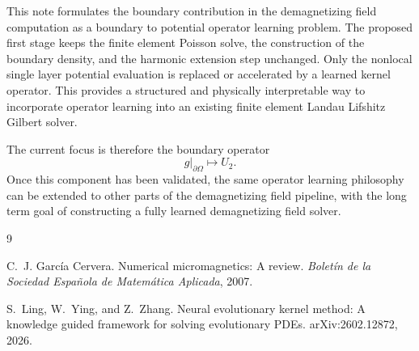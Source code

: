 \documentclass[11pt]{article}
\numberwithin{equation}{section}
\begin{document}
This note formulates the boundary contribution in the demagnetizing field computation as a boundary to potential operator learning problem. The proposed first stage keeps the finite element Poisson solve, the construction of the boundary density, and the harmonic extension step unchanged. Only the nonlocal single layer potential evaluation is replaced or accelerated by a learned kernel operator. This provides a structured and physically interpretable way to incorporate operator learning into an existing finite element Landau Lifshitz Gilbert solver.

The current focus is therefore the boundary operator
\begin{equation}
    g|_{\partial\Omega}
    \longmapsto
    U_2.
\end{equation}
Once this component has been validated, the same operator learning philosophy can be extended to other parts of the demagnetizing field pipeline, with the long term goal of constructing a fully learned demagnetizing field solver.


\begin{thebibliography}{9}

C.~J. Garc\'ia Cervera.
\newblock Numerical micromagnetics: A review.
\newblock \emph{Bolet\'in de la Sociedad Espa\~nola de Matem\'atica Aplicada}, 2007.

S.~Ling, W.~Ying, and Z.~Zhang.
\newblock Neural evolutionary kernel method: A knowledge guided framework for solving evolutionary PDEs.
\newblock arXiv:2602.12872, 2026.

\end{thebibliography}
\end{document}
